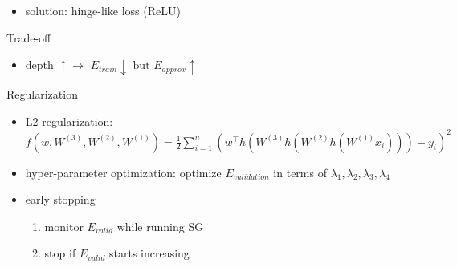 \documentclass[10pt,landscape,a4paper]{article}
\begin{document}
\begin{multicols*}{5}
\begin{itemize}
    \item solution: hinge-like loss (ReLU)
\end{itemize}
Trade-off
\begin{itemize}
    \item depth \(\uparrow \rightarrow \) \(E_{train} \downarrow \text{ but } E_{approx} \uparrow\)
\end{itemize}
Regularization
\begin{itemize}
    \item L2 regularization: \(f(w, W^{(3)}, W^{(2)}, W^{(1)}) = \frac{1}{2} \sum\limits_{i=1}^{n} (w^\intercal h(W^{(3)} h(W^{(2)} h(W^{(1)} x_i))) - y_i)^2\)
    \item hyper-parameter optimization: optimize \(E_{validation}\) in terms of \(\lambda_1, \lambda_2, \lambda_3, \lambda_4\)
    \item early stopping
    \begin{enumerate}
        \item monitor \(E_{valid}\) while running SG
        \item stop if \(E_{valid}\) starts increasing
    \end{enumerate}
\end{itemize}


\end{multicols*}
\end{document}
